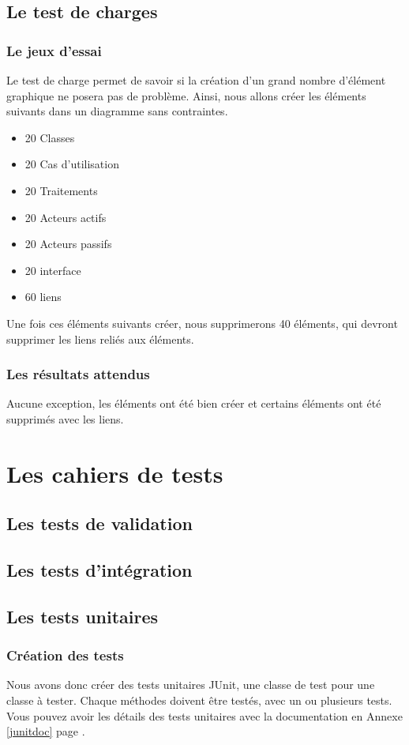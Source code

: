 \documentclass[12pt,a4paper,openany]{report}
\begin{document}
	\section{Le test de charges}
		\subsection{Le jeux d'essai}
		Le test de charge permet de savoir si la création d'un grand nombre d'élément graphique ne posera pas de problème. 
		Ainsi, nous allons créer les éléments suivants dans un diagramme sans contraintes.
		\begin{itemize}
			\item 20 Classes
			\item 20 Cas d'utilisation
			\item 20 Traitements
			\item 20 Acteurs actifs
			\item 20 Acteurs passifs
			\item 20 interface 
			\item 60 liens
		\end{itemize}
		Une fois ces éléments suivants créer, nous supprimerons 40 éléments, qui devront supprimer les liens reliés aux éléments.
		\subsection{Les résultats attendus}
		Aucune exception, les éléments ont été bien créer et certains éléments ont été supprimés avec les liens.
	\chapter{Les cahiers de tests}	
	\section{Les tests de validation}
	\section{Les tests d'intégration}
	\section{Les tests unitaires}
	\subsection{Création des tests}
	Nous avons donc créer des tests unitaires JUnit, une classe de test pour une classe à tester. Chaque méthodes doivent être testés, 
	avec un ou plusieurs tests.\\
	Vous pouvez avoir les détails des tests unitaires avec la documentation en Annexe \ref{junitdoc} page \pageref{junitdoc}.
\end{document}

